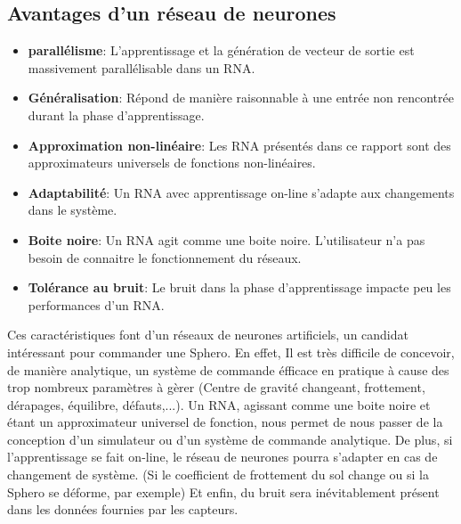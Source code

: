 \subsection{Avantages d'un réseau de neurones}
\begin{itemize}
 \item \textbf{parallélisme}: L'apprentissage et la génération de vecteur de sortie est massivement parallélisable dans un RNA.\cite{corelet,Haykin}
 \item \textbf{Généralisation}: Répond de manière raisonnable à une entrée non rencontrée durant la phase d'apprentissage.\cite{statistica,Haykin}
 \item \textbf{Approximation non-linéaire}: Les RNA présentés dans ce rapport sont des approximateurs universels de fonctions non-linéaires.\cite{Haykin}
 \item \textbf{Adaptabilité}: Un RNA avec apprentissage on-line s'adapte aux changements dans le système.\cite{Haykin}
 \item \textbf{Boite noire}: Un RNA agit comme une boite noire. L'utilisateur n'a pas besoin de connaitre le fonctionnement du réseaux.
 \item \textbf{Tolérance au bruit}: Le bruit dans la phase d'apprentissage impacte peu les performances d'un RNA.\cite{Haykin}
\end{itemize}
Ces caractéristiques font d'un réseaux de neurones artificiels, un candidat intéressant pour commander une Sphero. 
En effet, Il est très difficile de concevoir, de manière analytique, un système de commande éfficace en pratique à cause des trop nombreux paramètres à gèrer (Centre de gravité changeant, frottement, dérapages, équilibre, défauts,...).
Un RNA, agissant comme une boite noire et étant un approximateur universel de fonction, nous permet de nous passer de la conception d'un simulateur ou d'un système de commande analytique.
De plus, si l'apprentissage se fait on-line, le réseau de neurones pourra s'adapter en cas de changement de système. (Si le coefficient de frottement du sol change ou si la Sphero se déforme, par exemple)
Et enfin, du bruit sera inévitablement présent dans les données fournies par les capteurs.